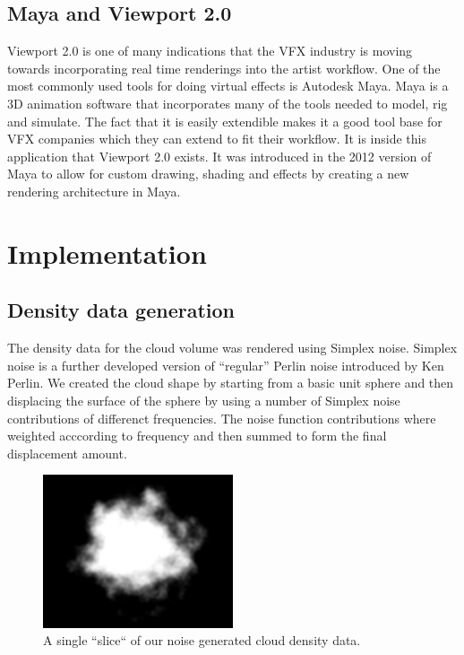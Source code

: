\documentclass[11pt,twocolumn]{article}
\begin{document}
\subsection{Maya and Viewport 2.0}
Viewport 2.0 is one of many indications that the VFX industry is moving towards incorporating real time renderings into the artist workflow.
One of the most commonly used tools for doing virtual effects is Autodesk Maya.
Maya is a 3D animation software that incorporates many of the tools needed to model, rig and simulate.
The fact that it is easily extendible makes it a good tool base for VFX companies which they can extend to fit their workflow.
It is inside this application that Viewport 2.0 exists.
It was introduced in the 2012 version of Maya to allow for custom drawing, shading and effects by creating a new rendering architecture in Maya.

\section{Implementation}
\subsection{Density data generation}
The density data for the cloud volume was rendered using Simplex noise. Simplex noise is a further developed version of ``regular'' Perlin noise introduced by Ken Perlin. We created the cloud shape by starting from a basic unit sphere and then displacing the surface of the sphere by using a number of Simplex noise contributions of differenct frequencies. The noise function contributions where weighted acccording to frequency and then summed to form the final displacement amount.

\begin{figure}[ht]
\includegraphics[width=0.5\textwidth]{figures/cumulus_slice.png}
\caption{A single ``slice`` of our noise generated cloud density data.}
\label{fig:cloud_slice}
\end{figure}
\end{document}
